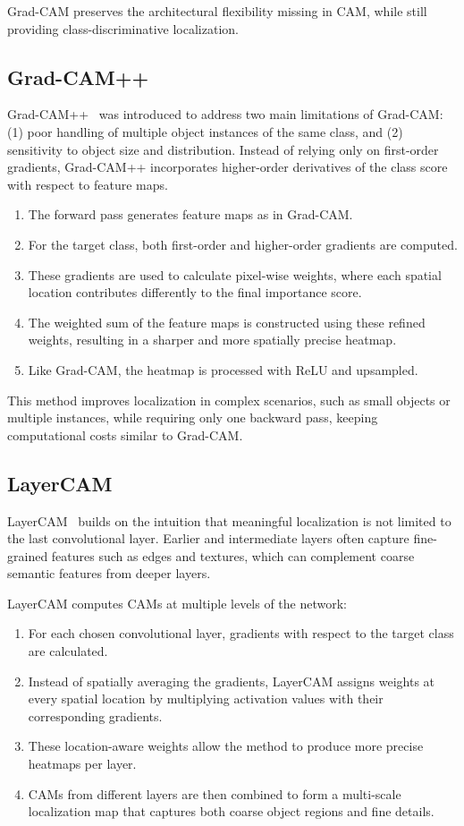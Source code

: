 Grad-CAM preserves the architectural flexibility missing in CAM, while still providing class-discriminative localization.

\subsection{Grad-CAM++}
Grad-CAM++~\cite{cam_gradpp} was introduced to address two main limitations of Grad-CAM: (1) poor handling of multiple object instances of the same class, and (2) sensitivity to object size and distribution. Instead of relying only on first-order gradients, Grad-CAM++ incorporates higher-order derivatives of the class score with respect to feature maps.

\begin{enumerate}
    \item The forward pass generates feature maps as in Grad-CAM.
    \item For the target class, both first-order and higher-order gradients are computed.
    \item These gradients are used to calculate pixel-wise weights, where each spatial location contributes differently to the final importance score.
    \item The weighted sum of the feature maps is constructed using these refined weights, resulting in a sharper and more spatially precise heatmap.
    \item Like Grad-CAM, the heatmap is processed with ReLU and upsampled.
\end{enumerate}

This method improves localization in complex scenarios, such as small objects or multiple instances, while requiring only one backward pass, keeping computational costs similar to Grad-CAM.

\subsection{LayerCAM}
LayerCAM~\cite{layer_cam} builds on the intuition that meaningful localization is not limited to the last convolutional layer. Earlier and intermediate layers often capture fine-grained features such as edges and textures, which can complement coarse semantic features from deeper layers.

LayerCAM computes CAMs at multiple levels of the network:
\begin{enumerate}
    \item For each chosen convolutional layer, gradients with respect to the target class are calculated.
    \item Instead of spatially averaging the gradients, LayerCAM assigns weights at every spatial location by multiplying activation values with their corresponding gradients.
    \item These location-aware weights allow the method to produce more precise heatmaps per layer.
    \item CAMs from different layers are then combined to form a multi-scale localization map that captures both coarse object regions and fine details.
\end{enumerate}

